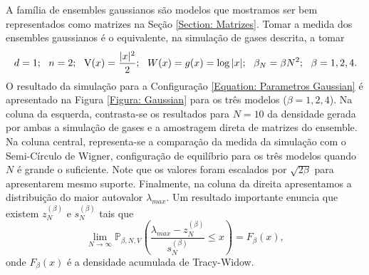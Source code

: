 \documentclass[12pt]{report}
\begin{document}
A família de ensembles gaussianos são modelos que mostramos ser bem representados como matrizes na Seção \ref{Section: Matrizes}. Tomar a medida dos ensembles gaussianos é o equivalente, na simulação de gases descrita, a tomar 
\begin{equation}
	d = 1; \ \  n = 2; \ \ \V(x)=\frac{|x|^2}{2}; \ \ W(x) = g(x) = \log{|x|}; \ \ \beta_N = \beta N^2; \ \ \beta = 1,2,4.
	\label{Equation: Parametros Gaussian}
\end{equation}
O resultado da simulação para a Configuração \eqref{Equation: Parametros Gaussian} é apresentado na Figura \ref{Figura: Gaussian} para os três modelos ($\beta = 1,2,4$). Na coluna da esquerda, contrasta-se os resultados para $N=10$ da densidade gerada por ambas a simulação de gases e a amostragem direta de matrizes do ensemble. Na coluna central, representa-se a comparação da medida da simulação com o Semi-Círculo de Wigner, configuração de equilíbrio para os três modelos quando $N$ é grande o suficiente. Note que os valores foram escalados por $\sqrt{2 \beta}$ para apresentarem mesmo suporte. Finalmente, na coluna da direita apresentamos a distribuição do maior autovalor $\lambda_{max}$. Um resultado importante enuncia que existem $z_{N}^{(\beta)}$ e $s_N^{(\beta)}$ tais que $$\lim_{N \to \infty} \mathbb{P}_{\beta,N,V} \left( \frac{\lambda_{max} - z_{N}^{(\beta)}}{s_N^{(\beta)}} \leq x \right) = F_{\beta}(x),$$ onde $F_{\beta}(x)$ é a densidade acumulada de Tracy-Widow. \cite{Tracy} 
\end{document}
